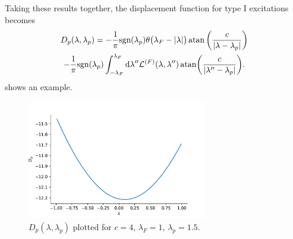 \documentclass[11pt, a4paper]{report} %
\begin{document}
Taking these results together, the displacement function for type I excitations becomes 
\begin{multline}
	D_p\qty(\lambda, \lambda_p) = - \frac{1}{\pi} \textrm{sgn}\qty(\lambda_p) \theta\qty\big(\lambda_F - \abs{\lambda})  \atan\left(\frac{c}{\abs{\lambda-\lambda_p}}\right) \\-\frac{1}{\pi}\textrm{sgn}\qty(\lambda_p) \int_{-\lambda_F}^{\lambda_F} \dd \lambda''   \mathcal{L}^{(F)}\qty(\lambda,\lambda'') \atan(\frac{c}{\abs{\lambda''-\lambda_p}}).
\end{multline}
 shows an example.
\begin{figure}[tb!]
  \centering
  \includegraphics[width=0.7\textwidth]{dpplot.pdf}
  \caption{$D_p(\lambda,\lambda_p)$ plotted for \(c=4\), \(\lambda_F=1\), \(\lambda_p=1.5\).}\label{fig:dpplot}
\end{figure}
\end{document}
